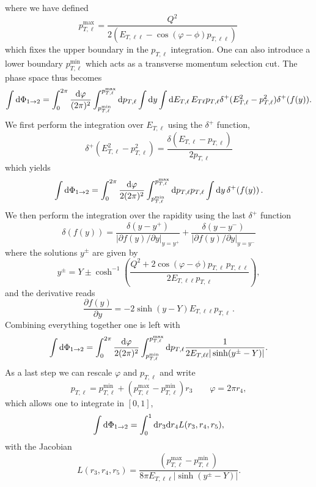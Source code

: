 \documentclass[a4paper,11pt]{article}
\begin{document}
where we have defined
\begin{equation}
\label{eq:leptonmaxpt}
p^{\max}_{T,\ell} = \frac{Q^2}{2\left(E_{T,\ell\ell} - \cos(\varphi-\phi)p_{T,\ell\ell}\right)}\,
\end{equation}
which fixes the upper boundary in the $p_{T,\ell}$ integration. 
One can also introduce a lower boundary $p^{\min}_{T,\ell}$ which acts as a 
transverse momentum selection cut.
The phase space thus becomes
\begin{equation}
\int \mathrm d \Phi_{1\to 2} =
\int^{2\pi}_0 \frac{\mathrm d\varphi}{(2\pi)^2}
\int^{p^{\max}_{T,\ell}}_{p^{\min}_{T,\ell}} \mathrm d p_{T,\ell}
\int \mathrm d y
\int \mathrm d E_{T,\ell}\,
E_{T\ell} p_{T,\ell} \delta^{+}(E_{T,\ell}^2 - p_{T,\ell}^2)\delta^{+}(f(y)).
\end{equation}
We first perform the integration over $E_{T,\ell}$ using the $\delta^{+}$ 
function, \ie
\begin{equation}
\delta^{+}(E_{T,\ell}^2 - p_{T,\ell}^2) = \frac{\delta(E_{T,\ell}-p_{T,\ell})}{2 p_{T,\ell}}
\end{equation}
which yields
\begin{equation}
\int \mathrm d \Phi_{1\to 2} =
\int^{2\pi}_0 \frac{\mathrm d\varphi}{2(2\pi)^2}
\int^{p^{\max}_{T,\ell}}_{p^{\min}_{T,\ell}} \mathrm d p_{T,\ell} p_{T,\ell} 
\int \mathrm d y\,\delta^{+}(f(y))\, .
\end{equation}
We then perform the integration over the rapidity using the last $\delta^{+}$ function
\begin{equation}
\delta(f(y)) = 
\frac{\delta(y-y^+)}{|\partial f(y)/\partial y|_{y=y^+}} +
\frac{\delta(y-y^-)}{|\partial f(y)/\partial y|_{y=y^-}}
\end{equation}
where the solutions $y^\pm$ are given by
\begin{equation}
\label{eq:rapiditysols}
y^\pm = Y \pm \cosh^{-1}\left( \frac{Q^2 + 2\cos(\varphi-\phi)p_{T,\ell}\,p_{T,\ell\ell}}{2 E_{T,\ell\ell} p_{T,\ell}} \right),
\end{equation}
and the derivative reads
\begin{equation}
\frac{\partial f(y)}{\partial y} = -2\sinh(y-Y) E_{T,\ell\ell} p_{T,\ell}\, .
\end{equation}
Combining everything together one is left with
\begin{equation}
\int \mathrm d \Phi_{1\to 2} =
\int^{2\pi}_0 \frac{\mathrm d\varphi}{2(2\pi)^2}
\int^{p^{\max}_{T,\ell}}_{p^{\min}_{T,\ell}} \mathrm d p_{T,\ell}
\frac{1}{2E_{T,\ell\ell}|\sinh(y^\pm-Y)|}.
\end{equation}
As a last step we can rescale $\varphi$ and $p_{T,\ell}$ and write
\begin{equation}
\label{eq:independentleptonvars}
p_{T,\ell} = p^{\min}_{T,\ell} + (p^{\max}_{T,\ell}-p^{\min}_{T,\ell}) r_3
\quad\quad
\varphi = 2\pi r_4,
\end{equation}
which allows one to integrate in $[0,1]$, \ie
\begin{equation}
\int \mathrm d \Phi_{1\to 2} =
\int^1_0 \mathrm d r_3 \mathrm d r_4 L(r_3,r_4,r_5),
\end{equation}
with the Jacobian
\begin{equation}
L(r_3,r_4,r_5) = 
\frac{(p^{\max}_{T,\ell}-p^{\min}_{T,\ell})}{8\pi E_{T,\ell\ell}|\sinh(y^\pm-Y)|}.
\end{equation}
\end{document}
